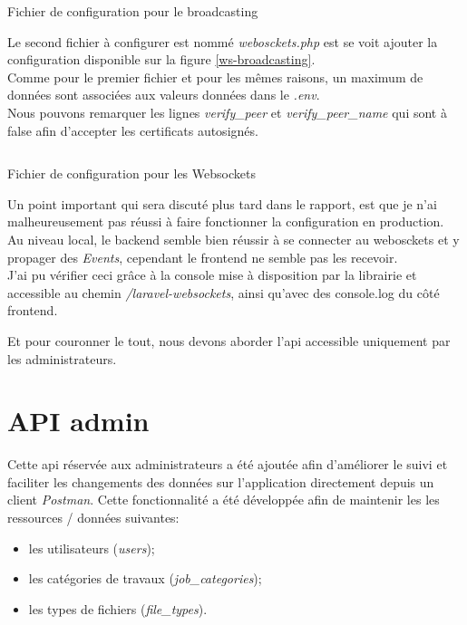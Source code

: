 \documentclass[
    iai, %
    il, %
]{heig-tb}
\begin{document}
\begin{listing}[h]
    \inputminted{php}{assets/code/broadcasting.php}
    \caption{Fichier de configuration pour le broadcasting \label{ws-broadcasting}}
\end{listing}

Le second fichier à configurer est nommé \emph{webosckets.php} est se voit ajouter la configuration disponible sur la figure \ref{ws-broadcasting}. \\
Comme pour le premier fichier et pour les mêmes raisons, un maximum de données sont associées aux valeurs données dans le \emph{.env}. \\
Nous pouvons remarquer les lignes \emph{verify\_peer} et \emph{verify\_peer\_name} qui sont à false afin d'accepter les certificats autosignés.

\begin{listing}[h]
    \inputminted{php}{assets/code/websockets.php}
    \caption{Fichier de configuration pour les Websockets \label{ws-websockets}}
\end{listing}

Un point important qui sera discuté plus tard dans le rapport, est que je n'ai malheureusement pas réussi à faire fonctionner la configuration en production. \\
Au niveau local, le  \Gls{backend} semble bien réussir à se connecter au webosckets et y propager des \emph{Events}, cependant le \Gls{frontend} ne semble pas les recevoir. \\
J'ai pu vérifier ceci grâce à la console mise à disposition par la librairie et accessible au chemin \emph{/laravel-websockets}, ainsi qu'avec des console.log du côté \Gls{frontend}.

Et pour couronner le tout, nous devons aborder l'\Gls{api} accessible uniquement par les administrateurs.

\section{API admin}
Cette \Gls{api} réservée aux administrateurs a été ajoutée afin d'améliorer le suivi et faciliter les changements des données sur l'application directement depuis un client \emph{Postman}.
Cette fonctionnalité a été développée afin de maintenir les les ressources / données suivantes:
\begin{itemize}
    \item les utilisateurs (\emph{users});
    \item les catégories de travaux (\emph{job\_categories});
    \item les types de fichiers (\emph{file\_types}).
\end{itemize}
\end{document}

